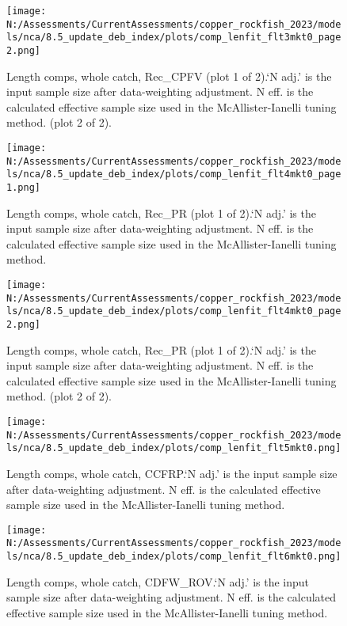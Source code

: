 \documentclass[11pt,
  english,
  letterpaper,
]{article}
\begin{document}
\begin{figure}
\centering
\texttt{[image: N:/Assessments/CurrentAssessments/copper\_rockfish\_2023/models/nca/8.5\_update\_deb\_index/plots/comp\_lenfit\_flt3mkt0\_page2.png]}
\caption{Length comps, whole catch, Rec\_CPFV (plot 1 of 2).`N adj.' is the input sample size after data-weighting adjustment. N eff. is the calculated effective sample size used in the McAllister-Ianelli tuning method. (plot 2 of 2).\label{fig:comp_lenfit_flt3mkt0_page2}}
\end{figure}

\begin{figure}
\centering
\texttt{[image: N:/Assessments/CurrentAssessments/copper\_rockfish\_2023/models/nca/8.5\_update\_deb\_index/plots/comp\_lenfit\_flt4mkt0\_page1.png]}
\caption{Length comps, whole catch, Rec\_PR (plot 1 of 2).`N adj.' is the input sample size after data-weighting adjustment. N eff. is the calculated effective sample size used in the McAllister-Ianelli tuning method.\label{fig:comp_lenfit_flt4mkt0_page1}}
\end{figure}

\begin{figure}
\centering
\texttt{[image: N:/Assessments/CurrentAssessments/copper\_rockfish\_2023/models/nca/8.5\_update\_deb\_index/plots/comp\_lenfit\_flt4mkt0\_page2.png]}
\caption{Length comps, whole catch, Rec\_PR (plot 1 of 2).`N adj.' is the input sample size after data-weighting adjustment. N eff. is the calculated effective sample size used in the McAllister-Ianelli tuning method. (plot 2 of 2).\label{fig:comp_lenfit_flt4mkt0_page2}}
\end{figure}

\begin{figure}
\centering
\texttt{[image: N:/Assessments/CurrentAssessments/copper\_rockfish\_2023/models/nca/8.5\_update\_deb\_index/plots/comp\_lenfit\_flt5mkt0.png]}
\caption{Length comps, whole catch, CCFRP.`N adj.' is the input sample size after data-weighting adjustment. N eff. is the calculated effective sample size used in the McAllister-Ianelli tuning method.\label{fig:comp_lenfit_flt5mkt0}}
\end{figure}

\begin{figure}
\centering
\texttt{[image: N:/Assessments/CurrentAssessments/copper\_rockfish\_2023/models/nca/8.5\_update\_deb\_index/plots/comp\_lenfit\_flt6mkt0.png]}
\caption{Length comps, whole catch, CDFW\_ROV.`N adj.' is the input sample size after data-weighting adjustment. N eff. is the calculated effective sample size used in the McAllister-Ianelli tuning method.\label{fig:comp_lenfit_flt6mkt0}}
\end{figure}
\end{document}
